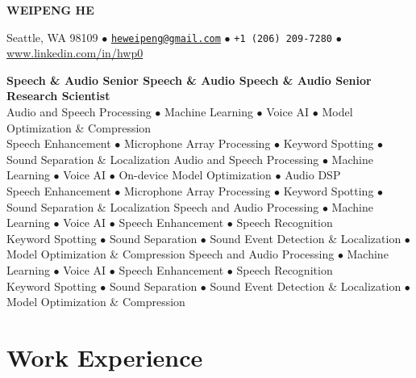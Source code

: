 \documentclass[a4paper,9pt]{extarticle} %
\newcommand{\version}{0}
\begin{document}
\thispagestyle{empty}


  {\Huge\bfseries\sffamily WEIPENG HE}

  Seattle, WA 98109 $\bullet$
  \href{mailto:heweipeng@gmail.com}{\texttt{heweipeng@gmail.com}} $\bullet$
  \texttt{+1 (206) 209-7280} $\bullet$
  \url{www.linkedin.com/in/hwp0}


{\LARGE\bfseries\sffamily %
\ifcase\version
  Speech \& Audio
\or
  Senior
\or
  Speech \& Audio
\or
  Speech \& Audio
\else
  Senior
\fi
Research Scientist} \\[4pt]
%
\ifcase\version
\or
  Audio and Speech Processing $\bullet$ Machine Learning $\bullet$ Voice AI $\bullet$ Model Optimization \& Compression \\
  Speech Enhancement $\bullet$ Microphone Array Processing $\bullet$ Keyword Spotting $\bullet$ Sound Separation \& Localization
\or
  Audio and Speech Processing $\bullet$ Machine Learning $\bullet$ Voice AI $\bullet$ On-device Model Optimization $\bullet$ Audio DSP \\
  Speech Enhancement $\bullet$ Microphone Array Processing $\bullet$ Keyword Spotting $\bullet$ Sound Separation \& Localization
\or
  Speech and Audio Processing $\bullet$ Machine Learning $\bullet$ Voice AI $\bullet$ Speech Enhancement $\bullet$ Speech Recognition \\
  Keyword Spotting $\bullet$ Sound Separation $\bullet$ Sound Event Detection \& Localization $\bullet$ Model Optimization \& Compression
\else
  Speech and Audio Processing $\bullet$ Machine Learning $\bullet$ Voice AI $\bullet$ Speech Enhancement $\bullet$ Speech Recognition \\
  Keyword Spotting $\bullet$ Sound Separation $\bullet$ Sound Event Detection \& Localization $\bullet$ Model Optimization \& Compression
\fi


\section{Work Experience}
\end{document}
